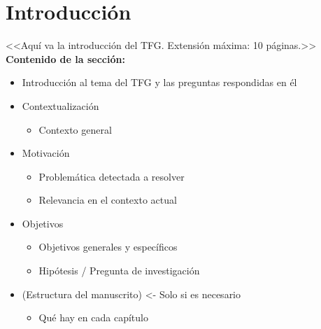 \chapter{Introducción}
<<Aquí va la introducción del TFG. Extensión máxima: 10 páginas.>>\\

\textbf{Contenido de la sección:}
\begin{itemize}
    \item Introducción al tema del TFG y las preguntas respondidas en él
    \item Contextualización
    \begin{itemize}
        \item Contexto general
    \end{itemize}
    \item Motivación
    \begin{itemize}
        \item Problemática detectada a resolver
        \item Relevancia en el contexto actual
    \end{itemize}
    \item Objetivos
    \begin{itemize}
        \item Objetivos generales y específicos
        \item Hipótesis / Pregunta de investigación
    \end{itemize}
    \item (Estructura del manuscrito) <- Solo si es necesario
    \begin{itemize}
        \item Qué hay en cada capítulo
    \end{itemize}
\end{itemize}

